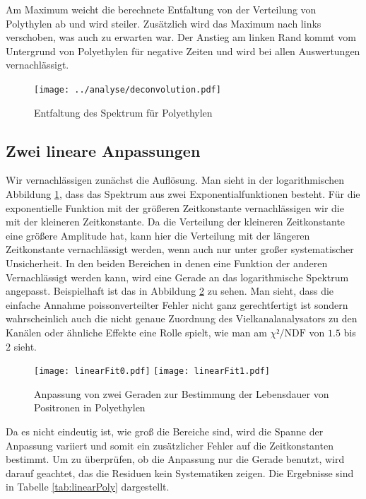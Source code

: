 \documentclass[a4paper,12pt]{article}
\begin{document}
Am Maximum weicht die berechnete Entfaltung von der Verteilung von Polythylen ab und wird steiler.
Zusätzlich wird das Maximum nach links verschoben, was auch zu erwarten war.
Der Anstieg am linken Rand kommt vom Untergrund von Polyethylen für negative Zeiten und wird bei allen Auswertungen vernachlässigt.


\begin{figure}
	\texttt{[image: ../analyse/deconvolution.pdf]}
	\caption{Entfaltung des Spektrum für Polyethylen}
	\label{fig:deconvolution}
\end{figure}
\subsection{Zwei lineare Anpassungen}
Wir vernachlässigen zunächst die Auflösung.
Man sieht in der logarithmischen Abbildung \ref{fig:deconvolution}, dass das Spektrum aus zwei Exponentialfunktionen
besteht. Für die exponentielle Funktion mit der größeren Zeitkonstante vernachlässigen wir die mit
der kleineren Zeitkonstante. Da die Verteilung der kleineren Zeitkonstante eine größere Amplitude
hat, kann hier die Verteilung mit der längeren Zeitkonstante vernachlässigt werden, wenn auch nur
unter großer systematischer Unsicherheit. In den beiden Bereichen in denen eine Funktion der anderen
Vernachlässigt werden kann, wird eine Gerade an das logarithmische Spektrum angepasst. Beispielhaft
ist das in Abbildung \ref{fig:dualLinearFit} zu sehen. Man sieht, dass die einfache Annahme
poissonverteilter Fehler nicht ganz gerechtfertigt ist sondern wahrscheinlich auch die nicht genaue
Zuordnung des Vielkanalanalysators zu den Kanälen oder ähnliche Effekte eine Rolle spielt, wie man
am $χ²/\text{NDF}$ von $1.5$ bis $2$ sieht.
\begin{figure}
	\texttt{[image: linearFit0.pdf]}
	\texttt{[image: linearFit1.pdf]}
	\caption{Anpassung von zwei Geraden zur Bestimmung der Lebensdauer von Positronen in Polyethylen}
	\label{fig:dualLinearFit}
\end{figure}

Da es nicht eindeutig ist, wie groß die Bereiche sind, wird die Spanne der
Anpassung variiert und somit ein zusätzlicher Fehler auf die Zeitkonstanten bestimmt.
Um zu überprüfen, ob die Anpassung nur die Gerade benutzt, wird darauf geachtet, das die Residuen
kein Systematiken zeigen.
Die Ergebnisse sind in Tabelle \ref{tab:linearPoly} dargestellt.
\end{document}
